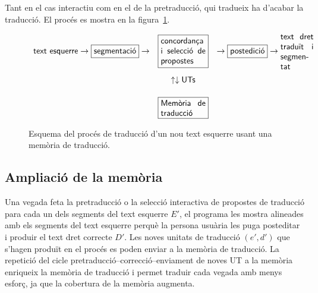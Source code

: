 Tant en el cas interactiu com en el de la pretraducció, qui tradueix
ha d'acabar la traducció. El procés es mostra en la
figura~\ref{fg:preMT}.
\begin{figure}
{\small
$$
\begin{array}{rcl}
\mbox{\textsf{text esquerre}} \to
\mbox{\framebox{\textsf{segmentació}}} \to &
\mbox{\framebox{\parbox{1.9cm}{\textsf{concordança i selecció de propostes}}}} & \to \mbox{\framebox{\textsf{postedició}}} \to \mbox{\parbox{1.4cm}{\textsf{text dret
    traduït i segmentat}}} \\[0.8cm]
& \uparrow \downarrow \mbox{\textsf{UTs}}& \\[0.5cm]
& \mbox{\framebox{\parbox{1.9cm}{\textsf{Memòria de traducció}}}} & \\
\end{array}
$$
}
\caption{Esquema del procés de traducció d'un nou text esquerre usant
  una memòria de traducció.}
\label{fg:preMT}
\end{figure}

\subsection{Ampliació de la memòria}

Una vegada feta la pretraducció o la selecció interactiva de propostes
de traducció para cada un dels segments del text esquerre $E'$, el
programa les mostra alineades amb els segments del text esquerre
perquè la persona usuària les puga posteditar i produir el text dret
correcte $D'$. Les noves unitats de traducció $(e',d')$ que s'hagen
produït en el procés es poden enviar a la memòria de traducció.  La
repetició del cicle pretraducció--correcció--enviament de noves UT a
la memòria enriqueix la memòria de traducció i permet traduir cada
vegada amb menys esforç, ja que la cobertura de la memòria augmenta.



